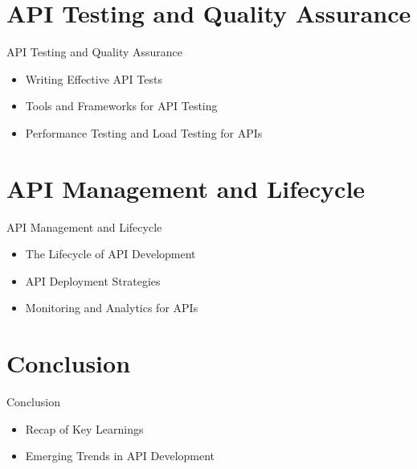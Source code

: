 \documentclass{beamer}
\begin{document}
\section{API Testing and Quality Assurance}
\begin{frame}{API Testing and Quality Assurance}
  \begin{itemize}
    \item Writing Effective API Tests
    \item Tools and Frameworks for API Testing
    \item Performance Testing and Load Testing for APIs
  \end{itemize}
\end{frame}


\section{API Management and Lifecycle}
\begin{frame}{API Management and Lifecycle}
  \begin{itemize}
    \item The Lifecycle of API Development
    \item API Deployment Strategies
    \item Monitoring and Analytics for APIs
  \end{itemize}
\end{frame}

\section{Conclusion}
\begin{frame}{Conclusion}
  \begin{itemize}
    \item Recap of Key Learnings
    \item Emerging Trends in API Development
  \end{itemize}
\end{frame}
\end{document}
